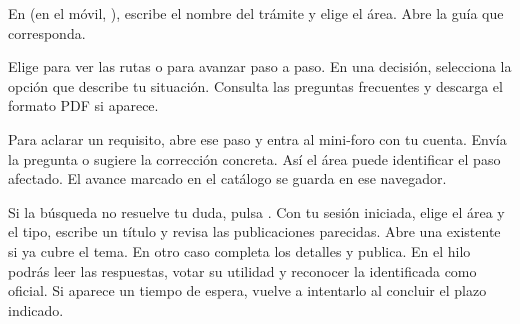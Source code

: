 \begin{pasos}
\item En  (en el móvil, ), escribe el nombre del trámite y elige el área. Abre la guía que corresponda.
\item Elige  para ver las rutas o  para avanzar paso a paso. En una decisión, selecciona la opción que describe tu situación. Consulta las preguntas frecuentes y descarga el formato PDF si aparece.
\item Para aclarar un requisito, abre ese paso y entra al mini-foro con tu cuenta. Envía la pregunta o sugiere la corrección concreta. Así el área puede identificar el paso afectado. El avance marcado en el catálogo se guarda en ese navegador.
\end{pasos}
Si la búsqueda no resuelve tu duda, pulsa . Con tu sesión iniciada, elige el área y el tipo, escribe un título y revisa las publicaciones parecidas. Abre una existente si ya cubre el tema. En otro caso completa los detalles y publica. En el hilo podrás leer las respuestas, votar su utilidad y reconocer la identificada como oficial. Si aparece un tiempo de espera, vuelve a intentarlo al concluir el plazo indicado.

